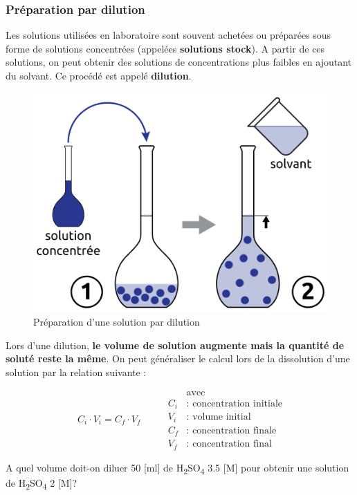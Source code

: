 \documentclass[
  11pt,
  a4paper,
  openany]{book}
\begin{document}
\subsubsection{Préparation par dilution}\label{pruxe9paration-par-dilution}

Les solutions utilisées en laboratoire sont souvent achetées ou préparées sous forme de solutions concentrées (appelées \textbf{solutions stock}). A partir de ces solutions, on peut obtenir des solutions de concentrations plus faibles en ajoutant du solvant. Ce procédé est appelé \textbf{dilution}.

\begin{figure}

{\centering \includegraphics[width=0.33\linewidth]{images/preparation-2} 

}

\caption{Préparation d'une solution par dilution}\label{fig:preparation-2}
\end{figure}

Lors d'une dilution, \textbf{le volume de solution augmente mais la quantité de soluté reste la même}. On peut généraliser le calcul lors de la dissolution d'une solution par la relation suivante :

\[
\begin{split}
C_i \cdot V_i = C_f \cdot V_f
\end{split}
\qquad
\begin{split}
  & \text{avec} \\
  C_i & \text{: concentration initiale} \\
  V_i & \text{: volume initial} \\
  C_f & \text{: concentration finale} \\
  V_f & \text{: concentration final}
\end{split}
\]

\newpage

\begin{Exercise}
A quel volume doit-on diluer 50 {[}ml{]} de H\textsubscript{2}SO\textsubscript{4} 3.5 {[}M{]} pour obtenir une solution de H\textsubscript{2}SO\textsubscript{4} 2 {[}M{]}?

\end{Exercise}
\end{document}
